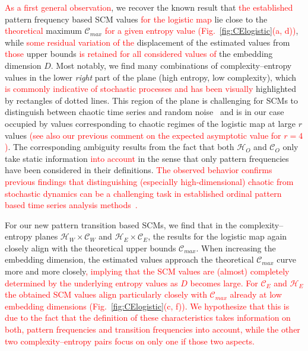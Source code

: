 \documentclass[aip,cha,reprint,nofootinbib]{revtex4-1}
\begin{document}
\textcolor{red}{As a first general observation}, we recover the known result that \textcolor{red}{the established} pattern frequency based SCM values \textcolor{red}{for the logistic map} lie close to the \textcolor{red}{theoretical} maximum $\mathcal{C}_{max}$ \textcolor{red}{for a given entropy value} \textcolor{red}{(Fig.~\ref{fig:CElogistic}(a, d))}, while \textcolor{red}{some residual variation of the} displacement of the estimated values from \textcolor{red}{those} upper bounds \textcolor{red}{is retained for all considered values of} the embedding dimension $D$. Most notably, we find many combinations of complexity--entropy values in the lower \emph{right} part of the plane (high entropy, low complexity), which \textcolor{red}{is commonly indicative of stochastic processes and has been visually} highlighted by rectangles of dotted lines. This region of the plane is challenging for SCMs to distinguish between chaotic time series and random noise~\cite{BorgesAMC2019} and is in our case occupied by values corresponding to chaotic regimes of the logistic map at large $r$ values \textcolor{red}{(see also our previous comment on the expected asymptotic value for $r=4$)}. The corresponding ambiguity results from the fact that both $\mathcal{H}_O$ and $\mathcal{C}_O$ only take static information \textcolor{red}{into account} in the sense that only pattern frequencies have been considered in their definitions. \textcolor{red}{The observed behavior confirms previous findings that distinguishing (especially high-dimensional) chaotic from stochastic dynamics can be a challenging task in established ordinal pattern based time series analysis methods~\cite{AmigoPTRSA2014,Riedl2013}.}

For our new pattern transition based SCMs, we find that in the complexity--entropy planes $\mathcal{H}_W \times \mathcal{C}_W$ and $\mathcal{H}_E \times \mathcal{C}_E$, the results for the logistic map again closely align with the theoretical upper bounds $\mathcal{C}_{max}$. When increasing the embedding dimension, the estimated values approach the theoretical $\mathcal{C}_{max}$ curve more and more closely\textcolor{red}{, implying that the SCM values are (almost) completely determined by the underlying entropy values as $D$ becomes large. For $\mathcal{C}_{E}$ and $\mathcal{H}_{E}$ the obtained SCM values align particularly closely with $\mathcal{C}_{max}$ already at low embedding dimensions (Fig.~\ref{fig:CElogistic}(c, f)). We hypothesize that this is due to the fact that the definition of these characteristics takes information on both, pattern frequencies and transition frequencies into account, while the other two complexity--entropy pairs focus on only one if those two aspects.}
\end{document}

